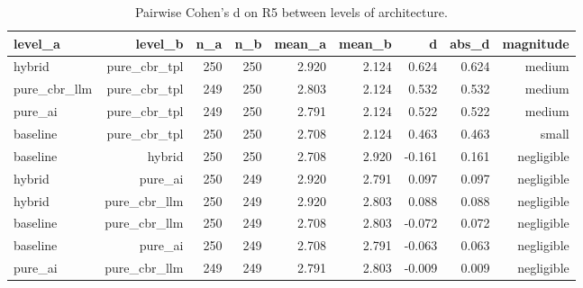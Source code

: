 \begin{table}[htbp]
\centering
\caption{Pairwise Cohen's d on R5 between levels of architecture.}
\label{tab:cohensd-architecture-R5}
\begin{tabular}{lrrrrrrrr}
\toprule
level\_a & level\_b & n\_a & n\_b & mean\_a & mean\_b & d & abs\_d & magnitude \\
\midrule
hybrid & pure\_cbr\_tpl & 250 & 250 & 2.920 & 2.124 & 0.624 & 0.624 & medium \\
pure\_cbr\_llm & pure\_cbr\_tpl & 249 & 250 & 2.803 & 2.124 & 0.532 & 0.532 & medium \\
pure\_ai & pure\_cbr\_tpl & 249 & 250 & 2.791 & 2.124 & 0.522 & 0.522 & medium \\
baseline & pure\_cbr\_tpl & 250 & 250 & 2.708 & 2.124 & 0.463 & 0.463 & small \\
baseline & hybrid & 250 & 250 & 2.708 & 2.920 & -0.161 & 0.161 & negligible \\
hybrid & pure\_ai & 250 & 249 & 2.920 & 2.791 & 0.097 & 0.097 & negligible \\
hybrid & pure\_cbr\_llm & 250 & 249 & 2.920 & 2.803 & 0.088 & 0.088 & negligible \\
baseline & pure\_cbr\_llm & 250 & 249 & 2.708 & 2.803 & -0.072 & 0.072 & negligible \\
baseline & pure\_ai & 250 & 249 & 2.708 & 2.791 & -0.063 & 0.063 & negligible \\
pure\_ai & pure\_cbr\_llm & 249 & 249 & 2.791 & 2.803 & -0.009 & 0.009 & negligible \\
\bottomrule
\end{tabular}
\end{table}
